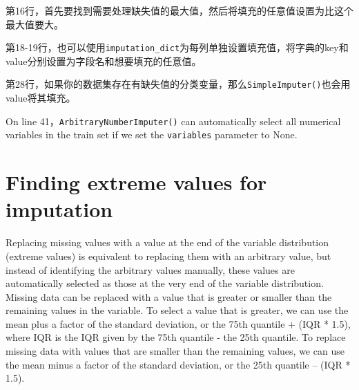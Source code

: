 第16行，首先要找到需要处理缺失值的最大值，然后将填充的任意值设置为比这个最大值要大。

第18-19行，也可以使用\verb|imputation_dict|为每列单独设置填充值，将字典的key和value分别设置为字段名和想要填充的任意值。

第28行，如果你的数据集存在有缺失值的分类变量，那么\verb|SimpleImputer()|也会用value将其填充。

On line 41，\verb|ArbitraryNumberImputer()| can automatically select all numerical variables in the
train set if we set the \verb|variables| parameter to None.

\section{Finding extreme values for imputation}
Replacing missing values with a value at the end of the variable distribution (extreme values) is
equivalent to replacing them with an arbitrary value, but instead of identifying the arbitrary values
manually, these values are automatically selected as those at the very end of the variable distribution.
Missing data can be replaced with a value that is greater or smaller than the remaining values in the
variable. To select a value that is greater, we can use the mean plus a factor of the standard deviation,
or the 75th quantile + (IQR * 1.5), where IQR is the IQR given by the 75th quantile - the 25th quantile.
To replace missing data with values that are smaller than the remaining values, we can use the mean
minus a factor of the standard deviation, or the 25th quantile – (IQR * 1.5).


